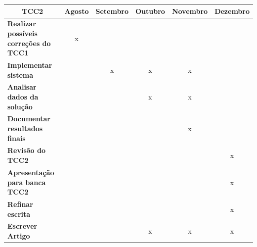 \begin{table}[]
	\begin{center}
	\begin{tabular}{|l|c|c|c|c|c|}
	\hline
	\multicolumn{1}{|c|}{\textbf{TCC2}}            & \multicolumn{1}{l|}{\textbf{Agosto}} & \multicolumn{1}{l|}{\textbf{Setembro}} & \multicolumn{1}{l|}{\textbf{Outubro}} & \multicolumn{1}{l|}{\textbf{Novembro}} & \multicolumn{1}{l|}{\textbf{Dezembro}} \\ \hline
	\textbf{Realizar possíveis correções  do TCC1} & x                                    &                                        &                                       &                                        &                                        \\ \hline
	\textbf{Implementar sistema}                   &                                      & x                                      & x                                     & x                                      &                                        \\ \hline
	\textbf{Analisar dados da solução}             &                                      &                                        & x                                     & x                                      &                                        \\ \hline
	\textbf{Documentar resultados finais}          &                                      &                                        &                                       & x                                      &                                        \\ \hline
	\textbf{Revisão do TCC2}                       &                                      &                                        &                                       &                                        & x                                      \\ \hline
	\textbf{Apresentação para banca TCC2}          &                                      &                                        &                                       &                                        & x                                      \\ \hline
	\textbf{Refinar escrita}                       &                                      &                                        &                                       &                                        & x                                      \\ \hline
	\textbf{Escrever Artigo}                       &                                      &                                        & x                                     & x                                      & x                                      \\ \hline
	\end{tabular}
	\end{center}
\end{table}